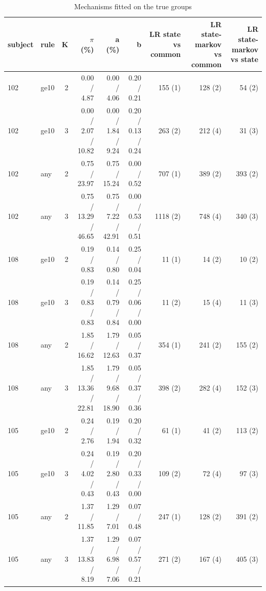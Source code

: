 \begin{table}[ht]
\centering
\small
\begin{tabular}{llrrrrrrr}
\toprule
subject & rule & K & $\pi$ (\%) & a (\%) & b & LR state vs common & LR state-markov vs common & LR state-markov vs state \\
\midrule
102 & ge10 & 2 & 0.00 / 4.87 & 0.00 / 4.06 & 0.20 / 0.21 & 155 (1) & 128 (2) & 54 (2) \\
102 & ge10 & 3 & 0.00 / 2.07 / 10.82 & 0.00 / 1.84 / 9.24 & 0.20 / 0.13 / 0.24 & 263 (2) & 212 (4) & 31 (3) \\
102 & any & 2 & 0.75 / 23.97 & 0.75 / 15.24 & 0.00 / 0.52 & 707 (1) & 389 (2) & 393 (2) \\
102 & any & 3 & 0.75 / 13.29 / 46.65 & 0.75 / 7.22 / 42.91 & 0.00 / 0.53 / 0.51 & 1118 (2) & 748 (4) & 340 (3) \\
108 & ge10 & 2 & 0.19 / 0.83 & 0.14 / 0.80 & 0.25 / 0.04 & 11 (1) & 14 (2) & 10 (2) \\
108 & ge10 & 3 & 0.19 / 0.83 / 0.83 & 0.14 / 0.79 / 0.84 & 0.25 / 0.06 / 0.00 & 11 (2) & 15 (4) & 11 (3) \\
108 & any & 2 & 1.85 / 16.62 & 1.79 / 12.63 & 0.05 / 0.37 & 354 (1) & 241 (2) & 155 (2) \\
108 & any & 3 & 1.85 / 13.36 / 22.81 & 1.79 / 9.68 / 18.90 & 0.05 / 0.37 / 0.36 & 398 (2) & 282 (4) & 152 (3) \\
105 & ge10 & 2 & 0.24 / 2.76 & 0.19 / 1.94 & 0.20 / 0.32 & 61 (1) & 41 (2) & 113 (2) \\
105 & ge10 & 3 & 0.24 / 4.02 / 0.43 & 0.19 / 2.80 / 0.43 & 0.20 / 0.33 / 0.00 & 109 (2) & 72 (4) & 97 (3) \\
105 & any & 2 & 1.37 / 11.85 & 1.29 / 7.01 & 0.07 / 0.48 & 247 (1) & 128 (2) & 391 (2) \\
105 & any & 3 & 1.37 / 13.83 / 8.19 & 1.29 / 6.98 / 7.06 & 0.07 / 0.57 / 0.21 & 271 (2) & 167 (4) & 405 (3) \\
\bottomrule
\end{tabular}
\caption{Mechanisms fitted on the true groups}
\end{table}
